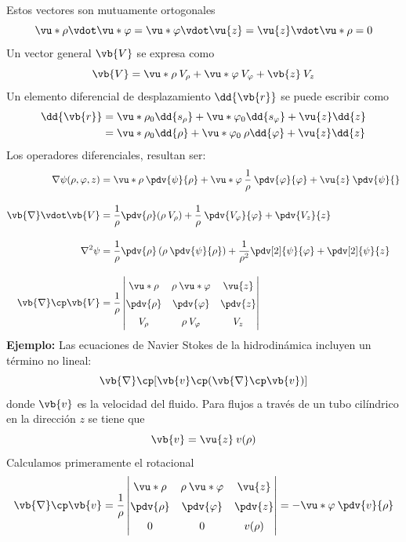 Estos vectores son mutuamente ortogonales
\[ \vu*{\rho} \vdot \vu*{\varphi} = \vu*{\varphi} \vdot \vu{z} = \vu{z} \vdot \vu*{\rho} = 0 \]
Un vector general $\vb{V}$ se expresa como
\[ \vb{V} =  \vu*{\rho} \: V_{\rho} + \vu*{\varphi} \: V_{\varphi} + \vb{z} \: V_{z} \]
Un elemento diferencial de desplazamiento $\dd{\vb{r}}$ se puede escribir como
\begin{align*}
\begin{aligned}
\dd{\vb{r}} &= \vu*{\rho}_{0} \dd{s_{\rho}} + \vu*{\varphi}_{0} \dd{s_{\varphi}} + \vu{z} \dd{z} \\
&= \vu*{\rho}_{0} \dd{\rho} + \vu*{\varphi}_{0} \: \rho \dd{\varphi} + \vu{z} \dd{z}
\end{aligned}
\end{align*}
Los operadores diferenciales, resultan ser:
\begin{align*}
\nabla \psi (\rho, \varphi, z) &= \vu*{\rho} \: \pdv{\psi}{\rho} + \vu*{\varphi} \: \dfrac{1}{\rho} \: \pdv{\varphi}{\varphi} + \vu{z} \: \pdv{\psi}{} \\[1em]
\vb{\nabla} \vdot \vb{V} &= \dfrac{1}{\rho} \pdv{\rho} (\rho \: V_{\rho}) + \dfrac{1}{\rho} \: \pdv{V_{\varphi}}{\varphi} + \pdv{V_{z}}{z} \\[1em]
\nabla^{2} \psi &= \dfrac{1}{\rho} \pdv{\rho} \left( \rho \: \pdv{\psi}{\rho} \right) + \dfrac{1}{\rho^{2}} \pdv[2]{\psi}{\varphi} + \pdv[2]{\psi}{z} \\[1em]
\vb{\nabla} \cp \vb{V} &= \dfrac{1}{\rho} 
\renewcommand\arraystretch{1.5} \begin{vmatrix}
\vu*{\rho} & \rho \: \vu*{\varphi} & \vu{z} \\
\displaystyle \pdv{\rho} & \displaystyle \pdv{\varphi} & \displaystyle \pdv{z} \\
V_{\rho} & \rho \: V_{\varphi} & V_{z}
\end{vmatrix}
\end{align*}
\textbf{Ejemplo: } Las ecuaciones de Navier Stokes de la hidrodinámica incluyen un término no lineal:
\[ \vb{\nabla} \cp [ \vb{v} \cp ( \vb{\nabla} \cp \vb{v})] \]
donde $\vb{v}$ es la velocidad del fluido. Para flujos a través de un tubo cilíndrico en la dirección $z$ se tiene que
\[ \vb{v} =  \vu{z} \: v (\rho) \]
Calculamos primeramente el rotacional
\begin{align*}
\vb{\nabla} \cp \vb{v} = \dfrac{1}{\rho} \left| 
\renewcommand\arraystretch{1.5} \begin{matrix}
\vu*{\rho} & \rho \: \vu*{\varphi} & \vu{z} \\
\displaystyle \pdv{\rho} & \displaystyle \pdv{\varphi} & \displaystyle \pdv{z} \\
0 & 0 & v(\rho)\end{matrix} \right| = - \vu*{\varphi} \: \pdv{v}{\rho}
\end{align*}
